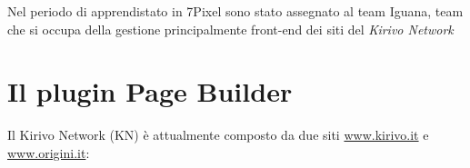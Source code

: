 


Nel periodo di apprendistato\cite{ETICHETTA} in 7Pixel sono stato assegnato al team Iguana, team che si occupa
della gestione principalmente front-end dei siti del \emph{Kirivo Network}

\section{Il plugin Page Builder}
Il Kirivo Network (KN) è attualmente composto da due siti  \url{www.kirivo.it} 
e \url{www.origini.it}:
